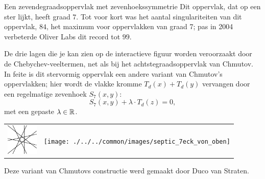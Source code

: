\begin{surferPage}[Zevenhoek]{Een zevendegraadsoppervlak met zevenhoekssymmetrie}
   Dit oppervlak, dat op een ster lijkt, heeft graad $7$.  
    Tot voor kort was het aantal singulariteiten van dit oppervlak, $84$, het maximum voor oppervlakken van graad 7;
    pas in 2004 verbeterde Oliver Labs dit record tot $99$.
  
  
De drie lagen die je kan zien op de interactieve figuur worden veroorzaakt door de Chebychev-veeltermen, net als bij het achtstegraadsoppervlak van Chmutov. 
    In feite is dit stervormig oppervlak een andere variant van Chmutov's oppervlakken; hier wordt de vlakke kromme $T_d(x)+T_d(y)$ vervangen door een regelmatige zevenhoek $S_7(x,y)$: 
   \[S_7(x,y) + \lambda \cdot T_d(z) = 0,\]
    met een gepaste $\lambda\in{\mathbb R}$. 
    \vspace*{-0.3em}
    \begin{center}
      \begin{tabular}{c@{\qquad}c}
        \includegraphics[height=1.5cm]{./../../common/images/labsseptic1.pdf}
        &
        \texttt{[image: ./../../common/images/septic\_7eck\_von\_oben]}
      \end{tabular}
    \end{center}
    \vspace*{-0.3em}   
   Deze variant van Chmutovs constructie werd gemaakt door Duco van Straten.
\end{surferPage}
